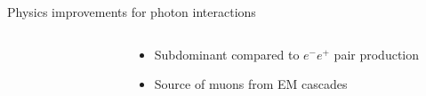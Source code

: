 \documentclass[t]{beamer}
\begin{document}
\begin{columns}[onlytextwidth]
\begin{column}{\textwidth}
\begin{block}{Physics improvements for photon interactions}
\begin{minipage}[t]{0.3\textwidth}
\begin{minipage}[t][10cm]{\textwidth}
\begin{columns}[onlytextwidth]
\begin{column}{0.35\textwidth}
\begin{figure}
\begin{tikzpicture}[>=stealth', pos=.55, photon/.style={decorate,decoration={snake,post length=2mm}}]
                    \end{tikzpicture}
                    \end{figure}
                \end{column}            
                \begin{column}{0.6\textwidth}%
                  \begin{itemize}[leftmargin=0.5cm]
                    \item Subdominant compared to $e^- e^+$ pair production
                    \item Source of muons from EM cascades

                  \end{itemize}
                \end{column}
            \end{columns}
          \end{minipage}
        \end{minipage}

      \end{block}
    \end{column}
    \end{columns}
\end{document}
